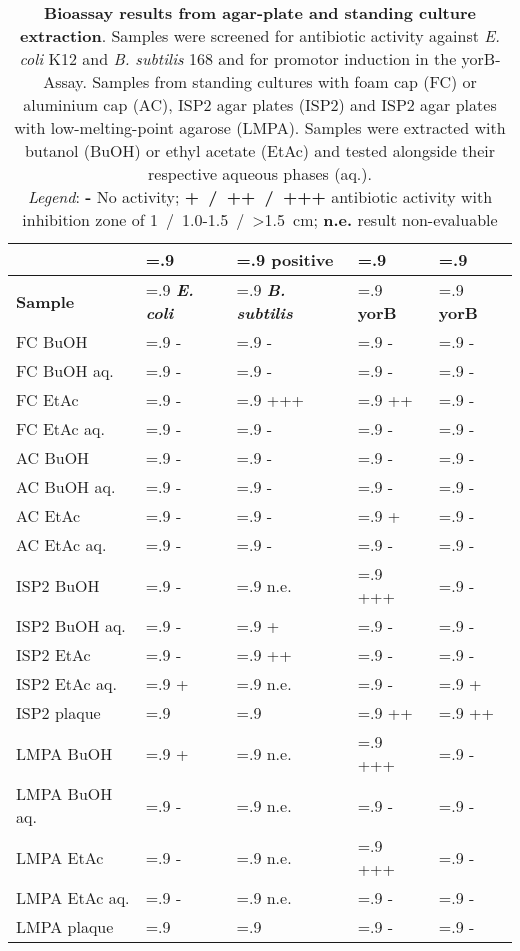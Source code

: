 \begin{table}[htbp]
    \caption[Bioassay results from agar-plate and standing culture extraction]{%
    	\textbf{Bioassay results from agar-plate and standing culture extraction}.
        Samples were screened for antibiotic activity against \textit{E. coli} K12 and \textit{B. subtilis} 168 and for promotor induction in the yorB-Assay.
        Samples from standing cultures with foam cap (FC) or aluminium cap (AC), ISP2 agar plates (ISP2) and ISP2 agar plates with low-melting-point agarose (LMPA).
        Samples were extracted with butanol (BuOH) or ethyl acetate (EtAc) and tested alongside their respective aqueous phases (aq.).\\
        \emph{Legend}: \textbf{-} No activity; \textbf{+~/~++~/~+++} antibiotic activity with inhibition zone of 1~/~1.0-1.5~/~>1.5~cm; \textbf{n.e.} result non-evaluable}
    \label{tab:yorB_assay_results}
    \centering
    \begin{tabularx}{\textwidth}{>{\hsize=1.4\hsize}X>{\hsize=.9\hsize}X>{\hsize=.9\hsize}X>{\hsize=.9\hsize}X>{\hsize=.9\hsize}X}
        \toprule
        & \multicolumn{3}{c}{Antibacterial} & positive \\
        \cline{2-4}
        \textbf{Sample} & \textbf{\textit{E. coli}}     & \textbf{\textit{B. subtilis}}  & \textbf{yorB}  & \textbf{yorB}    \\
        \midrule
        FC BuOH         & -     & -     & -     & -    \\
        FC BuOH aq.     & -     & -     & -     & -    \\
        FC EtAc         & -     & +++   & ++    & -    \\
        FC EtAc aq.     & -     & -     & -     & -    \\
        AC BuOH         & -     & -     & -     & -    \\
        AC BuOH aq.     & -     & -     & -     & -    \\
        AC EtAc         & -     & -     & +     & -    \\
        AC EtAc aq.     & -     & -     & -     & -    \\
        \midrule
        ISP2 BuOH       & -     & n.e.  & +++   & -    \\
        ISP2 BuOH aq.   & -     & +     & -     & -    \\
        ISP2 EtAc       & -     & ++    & -     & -    \\
        ISP2 EtAc aq.   & +     & n.e.  & -     & +    \\
        ISP2 plaque     &       &       & ++    & ++   \\
        \midrule
        LMPA BuOH       & +     & n.e.  & +++   & -    \\
        LMPA BuOH aq.   & -     & n.e.  & -     & -    \\
        LMPA EtAc       & -     & n.e.  & +++   & -    \\
        LMPA EtAc aq.   & -     & n.e.  & -     & -    \\
        LMPA plaque     &       &       & -     & -    \\
        \bottomrule
    \end{tabularx}
\end{table}
